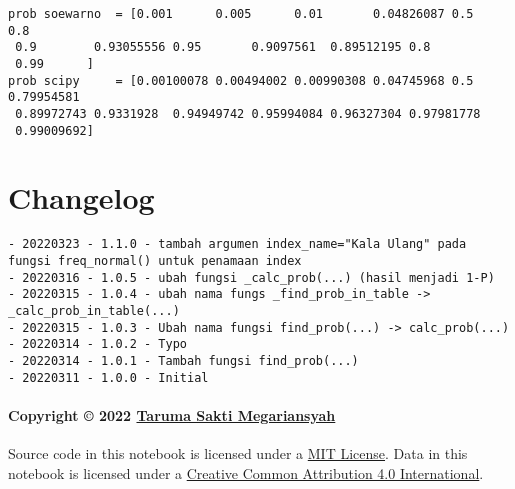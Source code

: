 \documentclass[11pt]{article}
\begin{document}
    \begin{Verbatim}[commandchars=\\\{\}]
prob soewarno  = [0.001      0.005      0.01       0.04826087 0.5        0.8
 0.9        0.93055556 0.95       0.9097561  0.89512195 0.8
 0.99      ]
prob scipy     = [0.00100078 0.00494002 0.00990308 0.04745968 0.5
0.79954581
 0.89972743 0.9331928  0.94949742 0.95994084 0.96327304 0.97981778
 0.99009692]
    \end{Verbatim}

    \hypertarget{changelog}{%
\section{Changelog}\label{changelog}}

\begin{verbatim}
- 20220323 - 1.1.0 - tambah argumen index_name="Kala Ulang" pada fungsi freq_normal() untuk penamaan index
- 20220316 - 1.0.5 - ubah fungsi _calc_prob(...) (hasil menjadi 1-P)
- 20220315 - 1.0.4 - ubah nama fungs _find_prob_in_table -> _calc_prob_in_table(...)
- 20220315 - 1.0.3 - Ubah nama fungsi find_prob(...) -> calc_prob(...)
- 20220314 - 1.0.2 - Typo
- 20220314 - 1.0.1 - Tambah fungsi find_prob(...)
- 20220311 - 1.0.0 - Initial
\end{verbatim}

\hypertarget{copyright-2022-taruma-sakti-megariansyah}{%
\paragraph{\texorpdfstring{Copyright © 2022
\href{https://taruma.github.io}{Taruma Sakti
Megariansyah}}{Copyright © 2022 Taruma Sakti Megariansyah}}\label{copyright-2022-taruma-sakti-megariansyah}}

Source code in this notebook is licensed under a
\href{https://choosealicense.com/licenses/mit/}{MIT License}. Data in
this notebook is licensed under a
\href{https://creativecommons.org/licenses/by/4.0/}{Creative Common
Attribution 4.0 International}.


    
    
    
\end{document}
